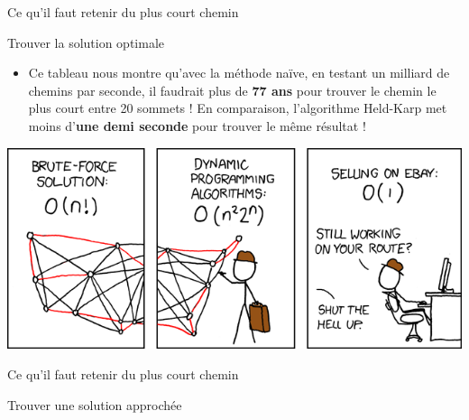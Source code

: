 \begin{frame}{Ce qu'il faut retenir du plus court chemin}
\begin{block}{Trouver la solution optimale}
\begin{itemize}
      \item Ce tableau nous montre qu'avec la méthode naïve, en testant un milliard de chemins par seconde, il faudrait plus de \textbf{77 ans} pour trouver le chemin le plus court entre 20 sommets ! En comparaison, l'algorithme Held-Karp met moins d'\textbf{une demi seconde} pour trouver le même résultat !
    \end{itemize}
  \end{block}

  \begin{center}
    \includegraphics[width=0.8\linewidth]{img/tsp_xkcd.png}
  \end{center}

\end{frame}

\begin{frame}{Ce qu'il faut retenir du plus court chemin}

  \begin{block}{Trouver une solution approchée}


  \end{block}

\end{frame}

